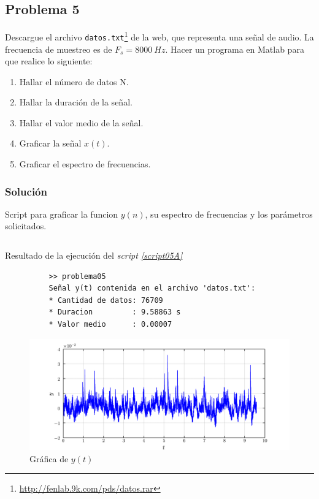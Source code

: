 \documentclass[a4paper,12pt,final]{article}
\begin{document}
  \newpage
  \subsection*{Problema 5}
    \noindent Descargue el archivo \texttt{datos.txt}\footnote{\url{http://fenlab.9k.com/pds/datos.rar}} de la web, que representa una señal de audio.
      La frecuencia de muestreo es de $F_s = 8000\ Hz$. Hacer un programa en Matlab para que realice
      lo siguiente:

      \begin{enumerate}[label=\alph*)]
        \item Hallar el número de datos N.
        \item Hallar la duración de la señal.
        \item Hallar el valor medio de la señal.
        \item Graficar la señal $x\left(t\right)$.
        \item Graficar el espectro de frecuencias.
      \end{enumerate}

    \subsubsection*{Solución}

      \begin{listing}[H]
        \caption{Script para graficar la funcion $y\left(n\right)$, su espectro de frecuencias y los parámetros solicitados.}
        \label{script05A}
        \inputminted{matlab}{./laboratorio_4/problema05.m}
      \end{listing}

      \begin{listing}[H]
        \caption{Resultado de la ejecución del \emph{script \ref{script05A}}}
        \label{script05B}
        \begin{verbatim}
          >> problema05
          Señal y(t) contenida en el archivo 'datos.txt':
          * Cantidad de datos: 76709
          * Duracion         : 9.58863 s
          * Valor medio      : 0.00007
        \end{verbatim}
      \end{listing}
      \vfill
      \newpage

      \begin{figure}[H]
        \begin{center}
          \caption{Gráfica de $y\left(t\right)$}
          \includegraphics[width=\textwidth]{./laboratorio_4/problema05_a.png}
        \end{center}
      \end{figure}
\end{document}
